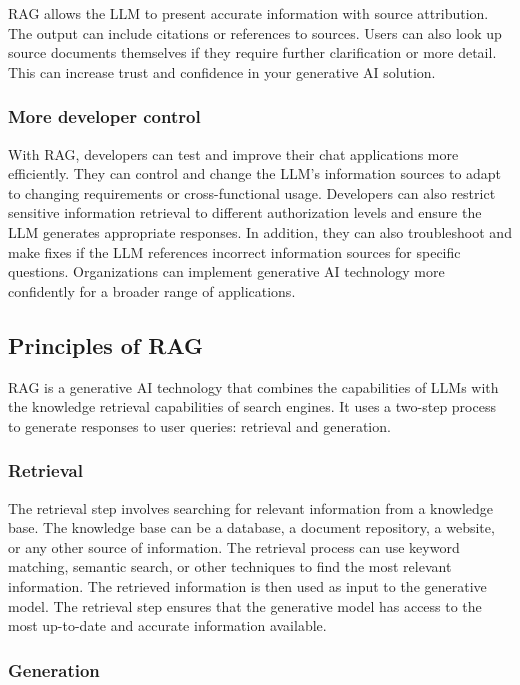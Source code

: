 RAG allows the LLM to present accurate information with source attribution. The output can include 
citations or references to sources. Users can also look up source documents themselves if they require 
further clarification or more detail. This can increase trust and confidence in your generative AI 
solution.

\subsubsection{More developer control}

With RAG, developers can test and improve their chat applications more efficiently. They can control 
and change the LLM's information sources to adapt to changing requirements or cross-functional usage. 
Developers can also restrict sensitive information retrieval to different authorization levels and 
ensure the LLM generates appropriate responses. In addition, they can also troubleshoot and make fixes 
if the LLM references incorrect information sources for specific questions. Organizations can implement 
generative AI technology more confidently for a broader range of applications.


\subsection{Principles of RAG}

RAG is a generative AI technology that combines the capabilities of LLMs with the knowledge retrieval 
capabilities of search engines. It uses a two-step process to generate responses to user queries: 
retrieval and generation.

\subsubsection{Retrieval}

The retrieval step involves searching for relevant information from a knowledge base. The knowledge 
base can be a database, a document repository, a website, or any other source of information. The 
retrieval process can use keyword matching, semantic search, or other techniques to find the most 
relevant information. The retrieved information is then used as input to the generative model. The 
retrieval step ensures that the generative model has access to the most up-to-date and accurate information 
available.

\subsubsection{Generation}

